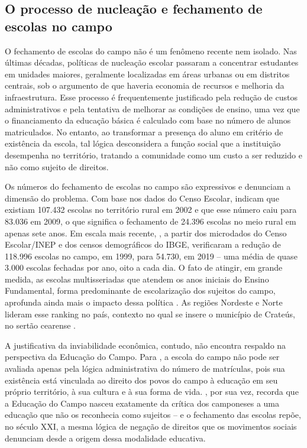 \documentclass[
  12pt,
  openright,
  twoside,
  a4paper,
  english,
  brazilian,
  sumario=tradicional
]{abntex2}
\begin{document}
\subsection{O processo de nucleação e fechamento de escolas no campo}
O fechamento de escolas do campo não é um fenômeno recente nem isolado. Nas últimas décadas, políticas de nucleação escolar passaram a concentrar estudantes em unidades maiores, geralmente localizadas em áreas urbanas ou em distritos centrais, sob o argumento de que haveria economia de recursos e melhoria da infraestrutura. Esse processo é frequentemente justificado pela redução de custos administrativos e pela tentativa de melhorar as condições de ensino, uma vez que o financiamento da educação básica é calculado com base no número de alunos matriculados. No entanto, ao transformar a presença do aluno em critério de existência da escola, tal lógica desconsidera a função social que a instituição desempenha no território, tratando a comunidade como um custo a ser reduzido e não como sujeito de direitos.

Os números do fechamento de escolas no campo são expressivos e denunciam a dimensão do problema. Com base nos dados do Censo Escolar,  indicam que existiam 107.432 escolas no território rural em 2002 e que esse número caiu para 83.036 em 2009, o que significa o fechamento de 24.396 escolas no meio rural em apenas sete anos. Em escala mais recente, , a partir dos microdados do Censo Escolar/INEP e dos censos demográficos do IBGE, verificaram a redução de 118.996 escolas no campo, em 1999, para 54.730, em 2019 -- uma média de quase 3.000 escolas fechadas por ano, oito a cada dia. O fato de atingir, em grande medida, as escolas multisseriadas que atendem os anos iniciais do Ensino Fundamental, forma predominante de escolarização dos sujeitos do campo, aprofunda ainda mais o impacto dessa política \cite{hage2014}. As regiões Nordeste e Norte lideram esse ranking no país, contexto no qual se insere o município de Crateús, no sertão cearense \cite{santosbezerra2025}.

A justificativa da inviabilidade econômica, contudo, não encontra respaldo na perspectiva da Educação do Campo. Para , a escola do campo não pode ser avaliada apenas pela lógica administrativa do número de matrículas, pois sua existência está vinculada ao direito dos povos do campo à educação em seu próprio território, à sua cultura e à sua forma de vida. , por sua vez, recorda que a Educação do Campo nasceu exatamente da crítica dos camponeses a uma educação que não os reconhecia como sujeitos -- e o fechamento das escolas repõe, no século XXI, a mesma lógica de negação de direitos que os movimentos sociais denunciam desde a origem dessa modalidade educativa.
\end{document}
